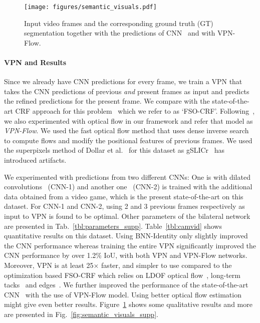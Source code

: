 \begin{figure}[th!]
\begin{center}
  \centerline{\texttt{[image: figures/semantic\_visuals.pdf]}}
    {Input video frames and the corresponding ground truth (GT)
    segmentation together with the predictions of CNN~\cite{yu2015multi} and with
    VPN-Flow.}
    \label{fig:semantic_visuals}
\end{center}
\vspace{-0.7cm}
\end{figure}

\vspace{-0.5cm}
\paragraph{VPN and Results} Since we already have CNN predictions for every
frame, we train a VPN that takes the CNN predictions of previous \emph{and} present
frames as input and predicts the refined predictions for the present frame.
We compare with the state-of-the-art CRF approach for this problem~\cite{kundu2016feature}
which we refer to as `FSO-CRF'. Following~\cite{kundu2016feature}, we also experimented with
optical flow in our framework and refer that model as \emph{VPN-Flow}.
We used the fast optical flow method that uses dense inverse search
~\cite{kroeger2016fast} to compute flows and modify the positional features of previous frames.
We used the superpixels method of Dollar et al.~\cite{DollarICCV13edges} for this dataset as
gSLICr~\cite{gSLICr_2015} has introduced artifacts.

We experimented with predictions from two different CNNs:
One is with dilated convolutions~\cite{yu2015multi} (CNN-1) and another one~\cite{richter2016playing} (CNN-2)
is trained with the additional data obtained from a video game,
which is the present state-of-the-art on this dataset.
For CNN-1 and CNN-2, using 2 and 3 previous frames respectively as input
to VPN is found to be optimal. Other parameters of the bilateral network are presented
in Tab.~\ref{tbl:parameters_supp}. Table~\ref{tbl:camvid} shows quantitative results on this dataset.
Using BNN-Identity only slightly improved the CNN performance whereas training the
entire VPN significantly improved the CNN performance by over 1.2\% IoU, with both
VPN and VPN-Flow networks. Moreover, VPN is at least 25$\times$ faster, and simpler to use
compared to the optimization based FSO-CRF which relies on
LDOF optical flow~\cite{brox2009large}, long-term tacks~\cite{sundaram2010dense} and
edges~\cite{dollar2015fast}.
We further improved the performance of the state-of-the-art CNN~\cite{richter2016playing}
with the use of VPN-Flow model. Using better optical flow estimation
might give even better results. Figure~\ref{fig:semantic_visuals} shows some qualitative
results and more are presented in Fig.~\ref{fig:semantic_visuals_supp}.

